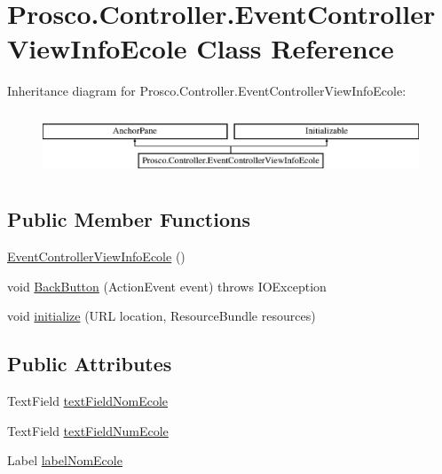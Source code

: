 \hypertarget{class_prosco_1_1_controller_1_1_event_controller_view_info_ecole}{\section{Prosco.\-Controller.\-Event\-Controller\-View\-Info\-Ecole Class Reference}
\label{class_prosco_1_1_controller_1_1_event_controller_view_info_ecole}
}
Inheritance diagram for Prosco.\-Controller.\-Event\-Controller\-View\-Info\-Ecole\-:\begin{figure}[H]
\begin{center}
\leavevmode
\includegraphics[height=1.911263cm]{class_prosco_1_1_controller_1_1_event_controller_view_info_ecole}
\end{center}
\end{figure}
\subsection*{Public Member Functions}
\begin{DoxyCompactItemize}
\item 
\hyperlink{class_prosco_1_1_controller_1_1_event_controller_view_info_ecole_abf1118ab2040d647c003beaa6d62ba0c}{Event\-Controller\-View\-Info\-Ecole} ()
\item 
void \hyperlink{class_prosco_1_1_controller_1_1_event_controller_view_info_ecole_a4f477e7ec1cad318e6cd6bfc8de750b4}{Back\-Button} (Action\-Event event)  throws I\-O\-Exception 
\item 
void \hyperlink{class_prosco_1_1_controller_1_1_event_controller_view_info_ecole_a31d7b1dcb8a4f2c61d02ed979ae8e31d}{initialize} (U\-R\-L location, Resource\-Bundle resources)
\end{DoxyCompactItemize}
\subsection*{Public Attributes}
\begin{DoxyCompactItemize}
\item 
Text\-Field \hyperlink{class_prosco_1_1_controller_1_1_event_controller_view_info_ecole_a09b2fd3c5664a9eef434358aca15be79}{text\-Field\-Nom\-Ecole}
\item 
Text\-Field \hyperlink{class_prosco_1_1_controller_1_1_event_controller_view_info_ecole_ad6c7a8611ef1f212d8540b3f24982466}{text\-Field\-Num\-Ecole}
\item 
Label \hyperlink{class_prosco_1_1_controller_1_1_event_controller_view_info_ecole_a1710c5a302a88e65a37b6aacc0734ec8}{label\-Nom\-Ecole}
\end{DoxyCompactItemize}


